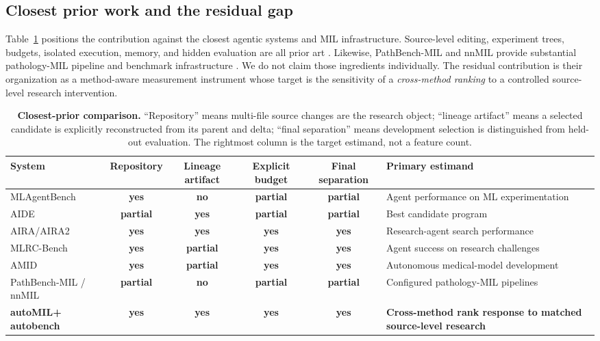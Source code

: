 \documentclass{article}
\newcommand{\ours}{\textsf{autoMIL}\xspace}
\newcommand{\autobench}{\textsf{autobench}\xspace}
\newcommand{\yes}{\textcolor{automilteal}{\textbf{yes}}}
\newcommand{\partialmark}{\textcolor{automilgold}{\textbf{partial}}}
\newcommand{\no}{\textcolor{automilgray}{\textbf{no}}}
\begin{document}
\subsection{Closest prior work and the residual gap}

Table~\ref{tab:prior} positions the contribution against the closest agentic
systems and MIL infrastructure.  Source-level editing, experiment trees,
budgets, isolated execution, memory, and hidden evaluation are all prior art
\cite{huang2024mlagentbench,jiang2025aide,toledo2025aira,
hambardzumyan2026aira2,zhang2025mlrcbench,liu2026amid}.  Likewise,
PathBench-MIL and nnMIL provide substantial pathology-MIL pipeline and
benchmark infrastructure \cite{brussee2025pathbenchmil,luo2025nnmil}.  We do
not claim those ingredients individually.  The residual contribution is their
organization as a method-aware measurement instrument whose target is the
sensitivity of a \emph{cross-method ranking} to a controlled source-level
research intervention.

\begin{table}[t]
\centering
\caption{\textbf{Closest-prior comparison.} ``Repository'' means multi-file
source changes are the research object; ``lineage artifact'' means a selected
candidate is explicitly reconstructed from its parent and delta; ``final
separation'' means development selection is distinguished from held-out
evaluation.  The rightmost column is the target estimand, not a feature count.}
\label{tab:prior}
\scriptsize
\setlength{\tabcolsep}{3.2pt}
\begin{tabularx}{\linewidth}{lccccX}
\toprule
System & Repository & Lineage artifact & Explicit budget & Final separation &
Primary estimand \\
\midrule
MLAgentBench \cite{huang2024mlagentbench} & \yes & \no & \partialmark & \partialmark &
Agent performance on ML experimentation \\
AIDE \cite{jiang2025aide} & \partialmark & \yes & \partialmark & \partialmark &
Best candidate program \\
AIRA/AIRA2 \cite{toledo2025aira,hambardzumyan2026aira2} & \yes & \yes & \yes & \yes &
Research-agent search performance \\
MLRC-Bench \cite{zhang2025mlrcbench} & \yes & \partialmark & \yes & \yes &
Agent success on research challenges \\
AMID \cite{liu2026amid} & \yes & \partialmark & \yes & \yes &
Autonomous medical-model development \\
PathBench-MIL / nnMIL \cite{brussee2025pathbenchmil,luo2025nnmil} &
\partialmark & \no & \partialmark & \partialmark &
Configured pathology-MIL pipelines \\
\textbf{\ours + \autobench} & \yes & \yes & \yes & \yes &
\textbf{Cross-method rank response to matched source-level research} \\
\bottomrule
\end{tabularx}
\end{table}
\end{document}
